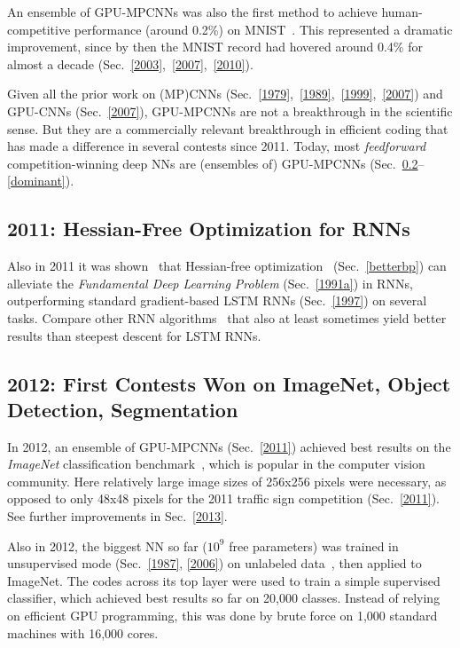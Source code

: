 \documentclass[letterpaper]{article}
\begin{document}
\begin{sloppypar}
An ensemble of GPU-MPCNNs was also the first method to achieve
human-competitive performance (around 0.2\%) on MNIST~\citep{ciresan2012cvpr}. 
This represented a dramatic improvement, since
by then the MNIST record had hovered around 0.4\% for almost a decade 
(Sec.~\ref{2003},~\ref{2007},~\ref{2010}). 

Given all the prior work on (MP)CNNs (Sec.~\ref{1979},~\ref{1989},~\ref{1999},~\ref{2007}) and GPU-CNNs (Sec.~\ref{2007}), 
GPU-MPCNNs are not a breakthrough in the scientific sense. 
But they are a commercially relevant breakthrough in efficient coding that has made a
difference in several contests since 2011. 
Today, most {\em feedforward} competition-winning deep NNs are (ensembles of) 
GPU-MPCNNs (Sec.~\ref{2012}--\ref{dominant}).

\subsection{2011: Hessian-Free Optimization for RNNs}
\label{2011rnn}

Also in 2011 it was shown~\citep{Martens:2011hessfree} that 
Hessian-free optimization~\citep[e.g.,][]{Moller:93,Pearlmutter:93,schraudolph02} (Sec.~\ref{betterbp})
can alleviate the 
{\em Fundamental Deep Learning Problem} (Sec.~\ref{1991a})
in RNNs, outperforming standard gradient-based 
LSTM RNNs (Sec.~\ref{1997}) on several tasks.
Compare other  RNN algorithms~\citep{Jaeger:04,Schmidhuber:07nc,pascanu2013,icml2014}
that also at least sometimes yield better results than steepest descent for LSTM RNNs.




\subsection{2012: First Contests Won on ImageNet, Object Detection, Segmentation}
\label{2012}

In 2012, an ensemble of GPU-MPCNNs (Sec.~\ref{2011}) 
achieved best results on the {\em ImageNet} classification benchmark~\citep{Krizhevsky:2012},
which is popular in the computer vision community.
Here relatively large image sizes of  256x256 pixels were necessary, 
as opposed to only 48x48 pixels for the 2011 traffic sign competition (Sec.~\ref{2011}).
See further improvements in Sec.~\ref{2013}.

Also in 2012, the biggest NN so far ($10^9$ free parameters) was trained
in unsupervised mode (Sec.~\ref{1987}, \ref{2006}) on unlabeled data~\citep{ng2012}, then applied to ImageNet. The codes across its top layer 
were used to train a simple supervised classifier,
which achieved best results so far on 20,000 classes.
Instead of relying on efficient GPU programming, this was done by brute force on 
1,000 standard machines with 16,000 cores.



\end{sloppypar}
\end{document}
